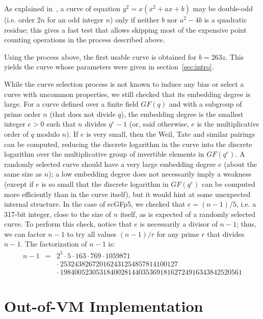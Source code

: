 \documentclass{llncs}
\newcommand{\GF}{GF}
\begin{document}
As explained in~\cite{Por2020-4}, a curve of equation
$y^2 = x(x^2 + ax + b)$ may be double-odd (i.e. order $2n$ for an odd
integer $n$) only if neither $b$ nor $a^2 - 4b$ is a quadratic residue;
this gives a fast test that allows skipping most of the expensive
point counting operations in the process described above.

Using the process above, the first usable curve is obtained for
$b = 263z$. This yields the curve whose parameters were given
in section~\ref{sec:intro}.

While the curve selection process is not known to induce any bias or
select a curve with uncommon properties, we still checked that its
embedding degree is large. For a curve defined over a finite field
$\GF(q)$ and with a subgroup of prime order $n$ (that does not divide
$q$), the embedding degree is the smallest integer $e > 0$ such that $n$
divides $q^e - 1$ (or, said otherwise, $e$ is the multiplicative order
of $q$ modulo $n$). If $e$ is very small, then the Weil, Tate and
similar pairings can be computed, reducing the discrete logarithm in the
curve into the discrete logarithm over the multiplicative group of
invertible elements in $\GF(q^e)$. A randomly selected curve should have
a very large embedding degree $e$ (about the same size as $n$); a low
embedding degree does not necessarily imply a weakness (except if $e$ is
so small that the discrete logarithm in $\GF(q^e)$ can be computed more
efficiently than in the curve itself), but it would hint at some
unexpected internal structure. In the case of ecGFp5, we checked that
$e = (n - 1)/5$, i.e. a 317-bit integer, close to the size of $n$ itself,
as is expected of a randomly selected curve. To perform this check, notice
that $e$ is necessarily a divisor of $n - 1$; thus, we can factor $n - 1$
to try all values $(n-1)/r$ for any prime $r$ that divides $n - 1$. The
factorization of $n - 1$ is:
\begin{eqnarray*}
    n - 1 &=& 2^5 \cdot 5 \cdot 163 \cdot 769 \cdot 1059871 \\
          & & \cdot\ 253243826720162431254857814100127 \\
          & & \cdot\ 198400523053184002814403536918162724916343842520561
\end{eqnarray*}

\section{Out-of-VM Implementation}
\end{document}
